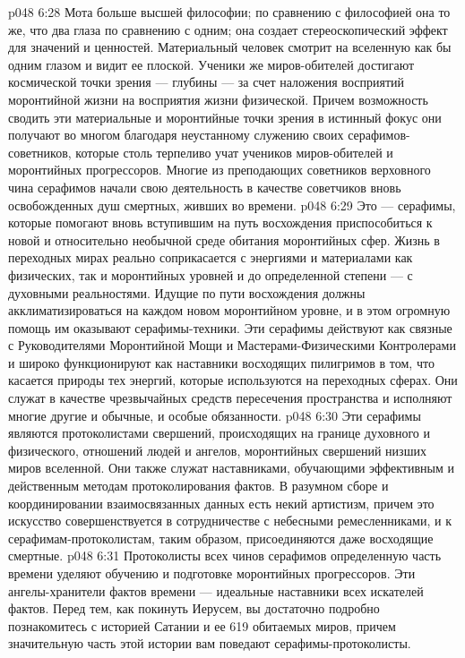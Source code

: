 \vs p048 6:28 Мота больше высшей философии; по сравнению с философией она то же, что два глаза по сравнению с одним; она создает стереоскопический эффект для значений и ценностей. Материальный человек смотрит на вселенную как бы одним глазом и видит ее плоской. Ученики же миров\hyp{}обителей достигают космической точки зрения --- глубины --- за счет наложения восприятий моронтийной жизни на восприятия жизни физической. Причем возможность сводить эти материальные и моронтийные точки зрения в истинный фокус они получают во многом благодаря неустанному служению своих серафимов\hyp{}советников, которые столь терпеливо учат учеников миров\hyp{}обителей и моронтийных прогрессоров. Многие из преподающих советников верховного чина серафимов начали свою деятельность в качестве советчиков вновь освобожденных душ смертных, живших во времени.
\vs p048 6:29 \pc {}\bibnobreakspace {} Это --- серафимы, которые помогают вновь вступившим на путь восхождения приспособиться к новой и относительно необычной среде обитания моронтийных сфер. Жизнь в переходных мирах реально соприкасается с энергиями и материалами как физических, так и моронтийных уровней и до определенной степени --- с духовными реальностями. Идущие по пути восхождения должны акклиматизироваться на каждом новом моронтийном уровне, и в этом огромную помощь им оказывают серафимы\hyp{}техники. Эти серафимы действуют как связные с Руководителями Моронтийной Мощи и Мастерами\hyp{}Физическими Контролерами и широко функционируют как наставники восходящих пилигримов в том, что касается природы тех энергий, которые используются на переходных сферах. Они служат в качестве чрезвычайных средств пересечения пространства и исполняют многие другие и обычные, и особые обязанности.
\vs p048 6:30 \pc {}\bibnobreakspace {} Эти серафимы являются протоколистами свершений, происходящих на границе духовного и физического, отношений людей и ангелов, моронтийных свершений низших миров вселенной. Они также служат наставниками, обучающими эффективным и действенным методам протоколирования фактов. В разумном сборе и координировании взаимосвязанных данных есть некий артистизм, причем это искусство совершенствуется в сотрудничестве с небесными ремесленниками, и к серафимам\hyp{}протоколистам, таким образом, присоединяются даже восходящие смертные.
\vs p048 6:31 Протоколисты всех чинов серафимов определенную часть времени уделяют обучению и подготовке моронтийных прогрессоров. Эти ангелы\hyp{}хранители фактов времени --- идеальные наставники всех искателей фактов. Перед тем, как покинуть Иерусем, вы достаточно подробно познакомитесь с историей Сатании и ее 619 обитаемых миров, причем значительную часть этой истории вам поведают серафимы\hyp{}протоколисты.
